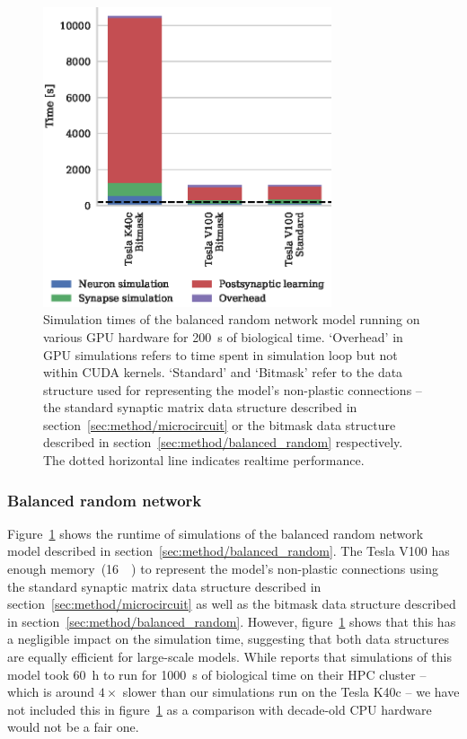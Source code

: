 \documentclass[utf8]{frontiersSCNS} %
\begin{document}
\begin{figure}
    \begin{center}
        \includegraphics[width=85mm]{figures/stdp_performance}
    \end{center}
    \caption{Simulation times of the balanced random network model running on various GPU hardware for \SI{200}{\second} of biological time.
    `Overhead' in GPU simulations refers to time spent in simulation loop but not within CUDA kernels.
    `Standard' and `Bitmask' refer to the data structure used for representing the model's non-plastic connections -- the standard synaptic matrix data structure described in section~\ref{sec:method/microcircuit} or the bitmask data structure described in section~\ref{sec:method/balanced_random} respectively.
    The dotted horizontal line indicates realtime performance.}
    \label{fig:stdp_performance}
\end{figure}

\subsubsection{Balanced random network}
Figure~\ref{fig:stdp_performance} shows the runtime of simulations of the balanced random network model described in section~\ref{sec:method/balanced_random}.
The Tesla V100 has enough memory~(\SI{16}{\giga\byte}) to represent the model's non-plastic connections using the standard synaptic matrix data structure described in section~\ref{sec:method/microcircuit} as well as the bitmask data structure described in section~\ref{sec:method/balanced_random}.
However, figure~\ref{fig:stdp_performance} shows that this has a negligible impact on the simulation time, suggesting that both data structures are equally efficient for large-scale models.
While \citet{Morrison2007} reports that simulations of this model took \SI{60}{\hour} to run for \SI{1000}{\second} of biological time on their HPC cluster -- which is around $4\times$ slower than our simulations run on the Tesla K40c -- we have not included this in figure~\ref{fig:stdp_performance} as a comparison with decade-old CPU hardware would not be a fair one.
\end{document}
